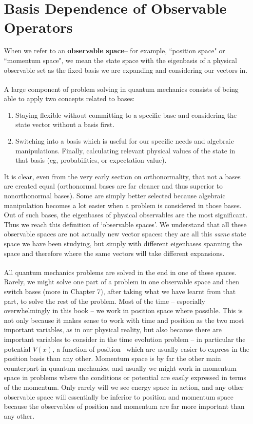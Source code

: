 \section{Basis Dependence of  Observable Operators}
When we refer to an \textbf{observable space}-- for example, ``position space" or ``momentum space", we mean the state space with the eigenbasis of a physical observable set as the fixed basis we are expanding and considering our vectors in.
\\\\
A large component of problem solving in quantum mechanics consists of being able to apply two concepts related to bases:
\begin{enumerate}
    \item Staying flexible without committing to a specific base and considering the state vector without a basis first.
    \item Switching into a basis which is useful for our specific needs and algebraic manipulations. Finally, calculating relevant physical values of the state in that basis (eg, probabilities, or expectation value).
\end{enumerate}
It is clear, even from the very early section on orthonormality, that not a bases are created equal (orthonormal bases are far cleaner and thus superior to nonorthonormal bases). Some are simply better selected because algebraic manipulation becomes a lot easier when a problem is considered in those bases. Out of such bases, the eigenbases of physical observables are the most significant. Thus we reach this definition of `observable spaces'. We understand that all these observable spaces are not actually new vector spaces: they are all this \textit{same} state space we have been studying, but simply with different eigenbases spanning the space and therefore where the same vectors will take different expansions. 
\\\\
All quantum mechanics problems are solved in the end in one of these spaces. Rarely, we might solve one part of a problem in one observable space and then switch bases (more in Chapter 7), after taking what we have learnt from that part, to solve the rest of the problem. Most of the time -- especially overwhelmingly in this book -- we work in position space where possible. This is not only because it makes sense to work with time and position as the two most important variables, as in our physical reality, but also because there are important variables to consider in the time evolution problem -- in particular the potential $V(x)$, a function of position-- which are usually easier to express in the position basis than any other. Momentum space is by far the other main counterpart in quantum mechanics, and usually we might work in momentum space in problems where the conditions or potential are easily expressed in terms of the momentum. Only rarely will we see energy space in action, and any other observable space will essentially be inferior to position and momentum space because the observables of position and momentum are far more important than any other.
